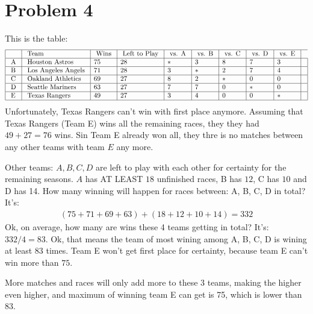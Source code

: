 \documentclass[]{article}
\theoremstyle{definition}
\begin{document}
\section{Problem 4}
    This is the table: 
    $$
    \begin{array}{|l|l|l|l|l|l|l|l|l|l|}
        \hline & \text { Team } & \text { Wins } & \text { Left to Play } & \text { vs. A } & \text { vs. B } & \text { vs. C } & \text { vs. D } & \text { vs. E } \\
        \hline \text { A } & \text { Houston Astros } & 75 & 28 & * & 3 & 8 & 7 & 3 & \\
        \hline \text { B } & \text { Los Angeles Angels } & 71 & 28 & 3 & * & 2 & 7 & 4 & \\
        \hline \text { C } & \text { Oakland Athletics } & 69 & 27 & 8 & 2 & * & 0 & 0 & \\
        \hline \text { D } & \text { Seattle Mariners } & 63 & 27 & 7 & 7 & 0 & * & 0 & \\
        \hline \text { E } & \text { Texas Rangers } & 49 & 27 & 3 & 4 & 0 & 0 & * & \\
        \hline
        \end{array}
    $$
    Unfortunately, Texas Rangers can't win with first place anymore. Assuming that Texas Rangers (Team E) wins all the remaining races, they they had $49 + 27 = 76$ wins. Sin Team E already won all, they thre is no matches between any other teams with team $E$ any more. 
    \par
    Other teams: $A, B, C, D$ are left to play with each other for certainty for the remaining seasons. $A$ has  AT LEAST $18$ unfinished races, B has $12$, C has $10$ and D has 14. How many winning will happen for races between: A, B, C, D in total? It's: 
    \begin{align}
        (75 + 71 + 69 + 63) + (18 + 12 + 10 + 14) = 332
    \end{align}
    Ok, on average, how many are wins these 4 teams getting in total? It's: $332/4 = 83$. Ok, that means the team of most wining among A, B, C, D is wining at least $83$ times. Team E won't get first place for certainty, because team E can't win more than $75$. 
    \par
    More matches and races will only add more to these 3 teams, making the higher even higher, and maximum of winning team E can get is 75, which is lower than 83. 
\end{document}
